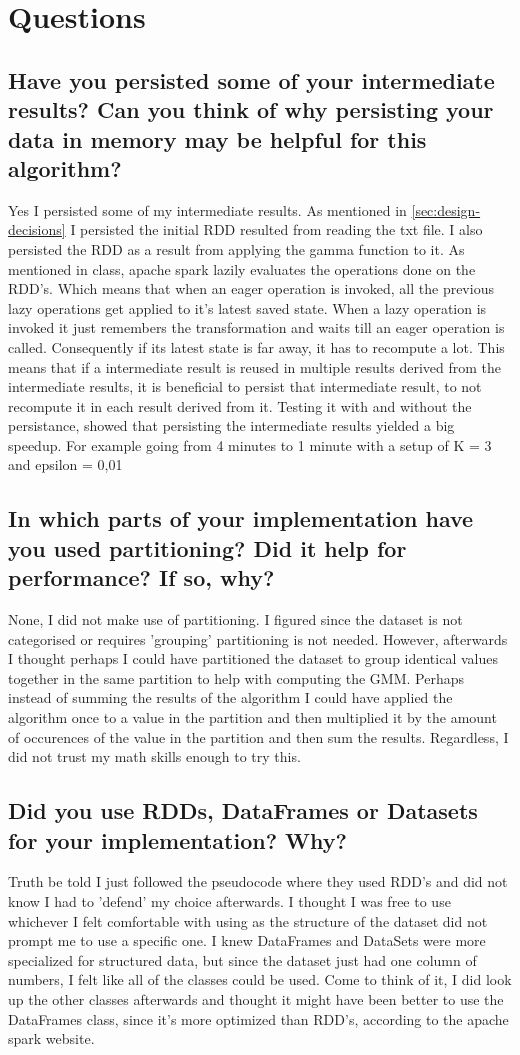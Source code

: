 \documentclass{article}
\begin{document}
\section{Questions}
\subsection{Have you persisted some of your intermediate results? Can you think of why persisting
	your data in memory may be helpful for this algorithm?}
Yes I persisted some of my intermediate results.
As mentioned in \ref{sec:design-decisions} I persisted the initial RDD resulted from reading the txt file.
I also persisted the RDD as a result from applying the gamma function to it.
As mentioned in class, apache spark lazily evaluates the operations done on the RDD's.
Which means that when an eager operation is invoked, all the previous lazy operations get applied to it's latest saved state.
When a lazy operation is invoked it just remembers the transformation and waits till an eager operation is called.
Consequently if its latest state is far away, it has to recompute a lot. This means that if a intermediate result is reused in multiple results derived from the intermediate results, it is beneficial to persist that intermediate result, to not recompute it in each result derived from it. Testing it with and without the persistance, showed that persisting the intermediate results yielded a big speedup. For example going from 4 minutes to 1 minute with a setup of K = 3 and epsilon = 0,01
\subsection{
	In which parts of your implementation have you used partitioning? Did it help for
	performance? If so, why?
}
None, I did not make use of partitioning.
I figured since the dataset is not categorised or requires 'grouping' partitioning is not needed.
However, afterwards I thought perhaps I could have partitioned the dataset to group identical values together in the same partition to help with computing the GMM.
Perhaps instead of summing the results of the algorithm I could have applied the algorithm once to a value in the partition and then multiplied it by the amount of occurences of the value in the partition and then sum the results. Regardless, I did not trust my math skills enough to try this.
\subsection{
	Did you use RDDs, DataFrames or Datasets for your implementation? Why?
}
Truth be told I just followed the pseudocode where they used RDD's and did not know I had to 'defend' my choice afterwards. I thought I was free to use whichever I felt comfortable with using as the structure of the dataset did not prompt me to use a specific one.
I knew DataFrames and DataSets were more specialized for structured data, but since the dataset just had one column of numbers, I felt like all of the classes could be used.
Come to think of it, I did look up the other classes afterwards and thought it might have been better to use the DataFrames class, since it's more optimized than RDD's, according to the apache spark website.
\end{document}
